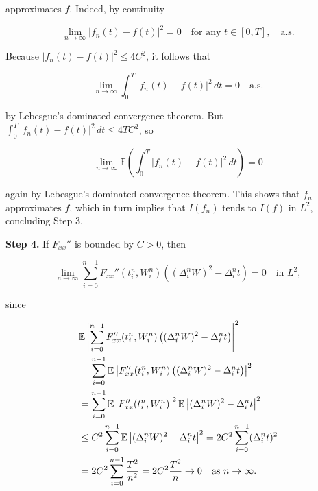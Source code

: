 \begin{Proof}
approximates $f$. Indeed, by continuity

\begin{equation}
\lim_{n \to \infty} |f_n(t) - f(t)|^2 = 0 \quad \text{for any } t \in [0, T], \quad \text{a.s.}
\end{equation}

Because $|f_n(t) - f(t)|^2 \leq 4C^2$, it follows that

\begin{equation}
\lim_{n \to \infty} \int_0^T |f_n(t) - f(t)|^2 \, dt = 0 \quad \text{a.s.}
\end{equation}

by Lebesgue's dominated convergence theorem. But $\int_0^T |f_n(t) - f(t)|^2 \, dt \leq 4TC^2$, so

\begin{equation}
\lim_{n \to \infty} \mathbb{E}\left(\int_0^T |f_n(t) - f(t)|^2 \, dt\right) = 0
\end{equation}

again by Lebesgue's dominated convergence theorem. This shows that $f_n$ approximates $f$, which in turn implies that $I(f_n)$ tends to $I(f)$ in $L^2$, concluding Step 3.

\medskip\noindent\textbf{Step 4.} If $F_{xx}''$ is bounded by $C > 0$, then

\begin{equation}
\lim_{n \to \infty} \sum_{i=0}^{n-1} F_{xx}''(t_i^n, W_i^n) \left((\Delta_i^n W)^2 - \Delta_i^n t\right) = 0 \quad \text{in } L^2,
\end{equation}

since

\begin{align}
& \mathbb{E}\left|\sum_{i=0}^{n-1} F_{xx}''(t_i^n, W_i^n) \left((\Delta_i^n W)^2 - \Delta_i^n t\right)\right|^2 \notag \\
& = \sum_{i=0}^{n-1} \mathbb{E}\left|F_{xx}''(t_i^n, W_i^n) \left((\Delta_i^n W)^2 - \Delta_i^n t\right)\right|^2 \label{eq:Step4_eq1} \\
& = \sum_{i=0}^{n-1} \mathbb{E}\left|F_{xx}''(t_i^n, W_i^n)\right|^2 \mathbb{E}\left|(\Delta_i^n W)^2 - \Delta_i^n t\right|^2 \label{eq:Step4_eq2} \\
& \leq C^2 \sum_{i=0}^{n-1} \mathbb{E}\left|(\Delta_i^n W)^2 - \Delta_i^n t\right|^2 = 2C^2 \sum_{i=0}^{n-1} (\Delta_i^n t)^2 \label{eq:Step4_eq3} \\
& = 2C^2 \sum_{i=0}^{n-1} \frac{T^2}{n^2} = 2C^2 \frac{T^2}{n} \to 0 \quad \text{as } n \to \infty. \label{eq:Step4_eq4}
\end{align}


\end{Proof}
